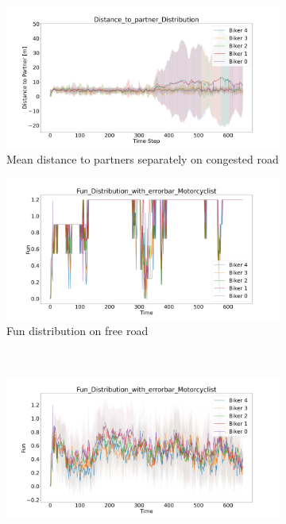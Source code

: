 \begin{figure}[H]
    \centering
        \begin{subfigure}[b]{0.45\textwidth}
        \centering
        \includegraphics[width=1.0\textwidth]{images/Nordracher/Nordracher_Distance_to_partner_distribution_congested.png}
        \caption{Mean distance to partners separately on congested road}
    \end{subfigure}
    \hfill
    \begin{subfigure}[b]{0.45\textwidth}
        \centering
        \includegraphics[width=1.0\textwidth]{images/Nordracher/Nordracher_K6769_Fun_Distribution_with_errorbar_free.png}
        \caption{Fun distribution on free road}
    \end{subfigure}
    \\
    \begin{subfigure}[b]{0.45\textwidth}
        \centering
        \includegraphics[width=1.0\textwidth]{images/Nordracher/Nordracher_Fun_Distribution_with_errorbar_congested.png}

\end{subfigure}
\end{figure}

